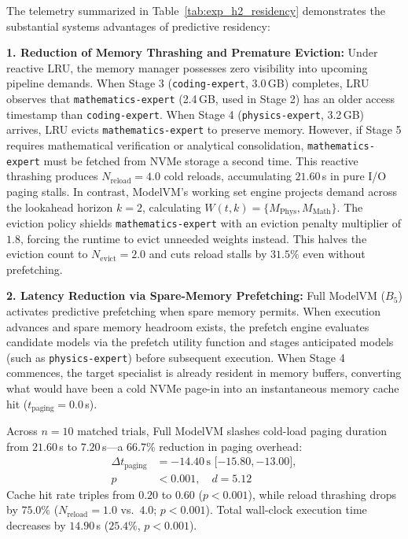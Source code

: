 The telemetry summarized in Table~\ref{tab:exp_h2_residency} demonstrates the substantial systems advantages of predictive residency:

\textbf{1. Reduction of Memory Thrashing and Premature Eviction:} Under reactive LRU, the memory manager possesses zero visibility into upcoming pipeline demands. When Stage 3 (\texttt{coding-expert}, 3.0\,GB) completes, LRU observes that \texttt{mathematics-expert} (2.4\,GB, used in Stage 2) has an older access timestamp than \texttt{coding-expert}. When Stage 4 (\texttt{physics-expert}, 3.2\,GB) arrives, LRU evicts \texttt{mathematics-expert} to preserve memory. However, if Stage 5 requires mathematical verification or analytical consolidation, \texttt{mathematics-expert} must be fetched from NVMe storage a second time. This reactive thrashing produces $N_{\text{reload}} = 4.0$ cold reloads, accumulating $21.60$\,s in pure I/O paging stalls. In contrast, ModelVM's working set engine projects demand across the lookahead horizon $k=2$, calculating $W(t, k) = \{M_{\text{Phys}}, M_{\text{Math}}\}$. The eviction policy shields \texttt{mathematics-expert} with an eviction penalty multiplier of $1.8$, forcing the runtime to evict unneeded weights instead. This halves the eviction count to $N_{\text{evict}} = 2.0$ and cuts reload stalls by $31.5\%$ even without prefetching.

\textbf{2. Latency Reduction via Spare-Memory Prefetching:} Full ModelVM ($B_5$) activates predictive prefetching when spare memory permits. When execution advances and spare memory headroom exists, the prefetch engine evaluates candidate models via the prefetch utility function and stages anticipated models (such as \texttt{physics-expert}) before subsequent execution. When Stage 4 commences, the target specialist is already resident in memory buffers, converting what would have been a cold NVMe page-in into an instantaneous memory cache hit ($t_{\text{paging}} = 0.0$\,s).

Across $n=10$ matched trials, Full ModelVM slashes cold-load paging duration from $21.60$\,s to $7.20$\,s---a $66.7\%$ reduction in paging overhead:
\begin{equation}
\begin{aligned}
\Delta t_{\text{paging}} &= -14.40\,\text{s [$-15.80, -13.00$]}, \\
p &< 0.001, \quad d = 5.12
\end{aligned}
\end{equation}
Cache hit rate triples from $0.20$ to $0.60$ ($p < 0.001$), while reload thrashing drops by $75.0\%$ ($N_{\text{reload}} = 1.0$ vs.\ $4.0$; $p < 0.001$). Total wall-clock execution time decreases by $14.90$\,s ($25.4\%$, $p < 0.001$).

